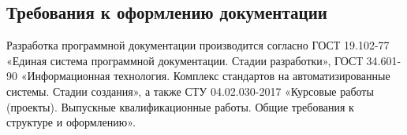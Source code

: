 \subsection{Требования к оформлению документации}

Разработка программной документации производится согласно ГОСТ 19.102-77 «Единая система программной документации. Стадии разработки», ГОСТ 34.601-90 «Информационная технология. Комплекс стандартов на автоматизированные системы. Стадии создания», а также СТУ 04.02.030-2017 «Курсовые работы (проекты). Выпускные квалификационные работы. Общие требования к структуре и оформлению».